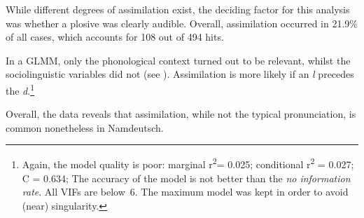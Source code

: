 \documentclass[output=paper]{langsci/langscibook}
\begin{document}
While different degrees of assimilation exist, the deciding factor for this analysis was whether a plosive was clearly audible. Overall, assimilation occurred in 21.9\% of all cases, which accounts for 108 out of 494 hits.

In a GLMM, only the phonological context turned out to be relevant, whilst the sociolinguistic variables did not (see ). Assimilation is more likely if an \textit{l} precedes the \textit{d}.\footnote{Again, the model quality is poor: marginal r\textsuperscript{2}= 0.025; conditional r\textsuperscript{2} = 0.027; C = 0.634; The accuracy of the model is not better than the \textit{no information rate}. All VIFs are below~6. The maximum model was kept in order to avoid (near) singularity.}

\begin{table}
\caption{Results of a GLMM (assimilation of intervocalic \textit{nd} and \textit{ld})\label{tab:stuhl:5}}
\end{table}

Overall, the data reveals that assimilation, while not the typical pronunciation, is common nonetheless in Namdeutsch. 
\end{document}
